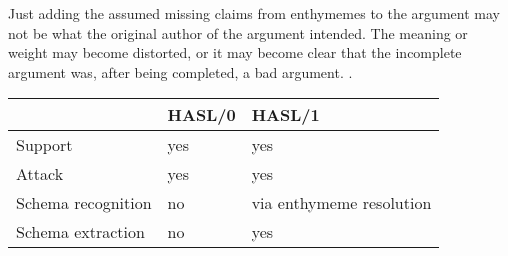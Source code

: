 Just adding the assumed missing claims from enthymemes to the argument may not be what the original author of the argument intended. The meaning or weight may become distorted, or it may become clear that the incomplete argument was, after being completed, a bad argument. \cite{waltonReed2005}. 

\begin{table}
	\begin{tabular}{l|ll|}
		& HASL/0 & HASL/1  \\
		\hline
		Support & yes & yes \\
		Attack & yes & yes \\
		Schema recognition & no & via enthymeme resolution \\
		Schema extraction & no & yes
	\end{tabular}
\end{table}